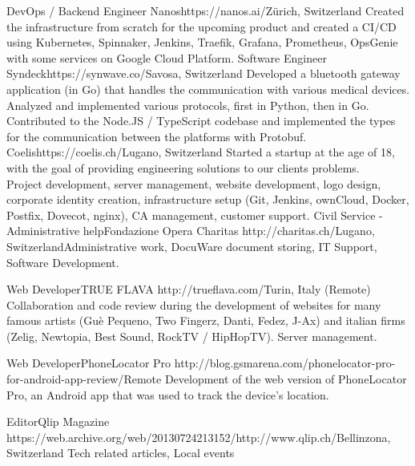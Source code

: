 \begin{CV}
        {DevOps / Backend Engineer}
        {Nanos}{https://nanos.ai/}{Zürich, Switzerland}
        {Created the infrastructure from scratch for the upcoming product 
        and created a CI/CD using Kubernetes, Spinnaker, Jenkins,
        Traefik, Grafana, Prometheus, OpsGenie with some services on
        Google Cloud Platform.}
        {Software Engineer}
        {Syndeck}{https://synwave.co/}{Savosa, Switzerland}
        {Developed a bluetooth gateway application (in Go) that handles the communication with various
        medical devices. Analyzed and implemented various protocols, first in Python, then in Go.
        Contributed to the Node.JS / TypeScript codebase and implemented the types for the communication 
        between the platforms with Protobuf.}
        {Coelis}{https://coelis.ch/}{Lugano, Switzerland}
        {Started a startup at the age of 18, with the goal of providing engineering solutions to our clients problems.\\
        Project development, server management, website development, logo design, 
        corporate identity creation, infrastructure setup (Git, Jenkins, ownCloud, Docker, Postfix, Dovecot, nginx),
        CA management, customer support.}
    \pagebreak
    {Civil Service - Administrative help}{Fondazione Opera Charitas}
    {http://charitas.ch/}{Lugano, Switzerland}{Administrative work, DocuWare document storing, IT Support, Software Development.}

    {Web Developer}{TRUE FLAVA}
    {http://trueflava.com/}{Turin, Italy (Remote)}{
        Collaboration and code review during the development of websites for many famous artists (Guè Pequeno,
        Two Fingerz, Danti, Fedez, J-Ax) and italian firms (Zelig, Newtopia, Best Sound, RockTV / HipHopTV). 
        Server management.
    }

    {Web Developer}{PhoneLocator Pro}
    {http://blog.gsmarena.com/phonelocator-pro-for-android-app-review/}{Remote}
    {Development of the web version of PhoneLocator Pro, an Android app that was used 
    to track the device's location.}

    {Editor}{Qlip Magazine}
    {https://web.archive.org/web/20130724213152/http://www.qlip.ch/}{Bellinzona, Switzerland}
    {Tech related articles, Local events}
\end{CV}